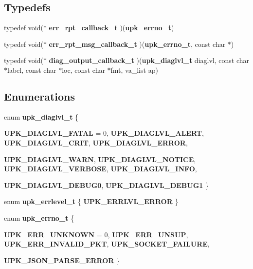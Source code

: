 \subsection*{Typedefs}
\begin{DoxyCompactItemize}
\item 
typedef void($\ast$ {\bf err\_\-rpt\_\-callback\_\-t} )({\bf upk\_\-errno\_\-t})
\item 
typedef void($\ast$ {\bf err\_\-rpt\_\-msg\_\-callback\_\-t} )({\bf upk\_\-errno\_\-t}, const char $\ast$)
\item 
typedef void($\ast$ {\bf diag\_\-output\_\-callback\_\-t} )({\bf upk\_\-diaglvl\_\-t} diaglvl, const char $\ast$label, const char $\ast$loc, const char $\ast$fmt, va\_\-list ap)
\end{DoxyCompactItemize}
\subsection*{Enumerations}
\begin{DoxyCompactItemize}
\item 
enum {\bf upk\_\-diaglvl\_\-t} \{ \par
{\bf UPK\_\-DIAGLVL\_\-FATAL} =  0, 
{\bf UPK\_\-DIAGLVL\_\-ALERT}, 
{\bf UPK\_\-DIAGLVL\_\-CRIT}, 
{\bf UPK\_\-DIAGLVL\_\-ERROR}, 
\par
{\bf UPK\_\-DIAGLVL\_\-WARN}, 
{\bf UPK\_\-DIAGLVL\_\-NOTICE}, 
{\bf UPK\_\-DIAGLVL\_\-VERBOSE}, 
{\bf UPK\_\-DIAGLVL\_\-INFO}, 
\par
{\bf UPK\_\-DIAGLVL\_\-DEBUG0}, 
{\bf UPK\_\-DIAGLVL\_\-DEBUG1}
 \}
\item 
enum {\bf upk\_\-errlevel\_\-t} \{ {\bf UPK\_\-ERRLVL\_\-ERROR}
 \}
\item 
enum {\bf upk\_\-errno\_\-t} \{ \par
{\bf UPK\_\-ERR\_\-UNKNOWN} =  0, 
{\bf UPK\_\-ERR\_\-UNSUP}, 
{\bf UPK\_\-ERR\_\-INVALID\_\-PKT}, 
{\bf UPK\_\-SOCKET\_\-FAILURE}, 
\par
{\bf UPK\_\-JSON\_\-PARSE\_\-ERROR}
 \}
\end{DoxyCompactItemize}
